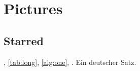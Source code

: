 \chapter{Pictures}\label{ch:three}
\section*{Starred}
, \autoref{tab:long}, \autoref{alg:one}, \cite{lamport94}.
\foreignlanguage{ngerman}{Ein deutscher Satz.}
